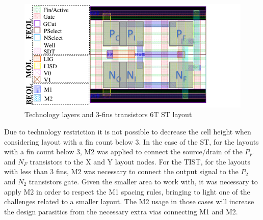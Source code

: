 \documentclass[pgmicro,mestrado,english]{iiufrgs}
\begin{document}
\begin{figure}[]
\centering
\includegraphics[width=\textwidth, trim={0 0 1.5cm 0},clip]{camadasSTv2.pdf}
\caption{Technology layers and 3-fins transistors 6T ST layout}
\label{fig:layers}
\end{figure}



Due to technology restriction it is not possible to decrease the cell height when considering layout with a fin count below 3. In the case of the ST, for the layouts with a fin count below 3, M2 was applied to connect the source/drain of the ${P_F}$ and ${N_F}$ transistors to the X and Y layout nodes. For the TIST, for the layouts with less than 3 fins, M2 was necessary to connect the output signal to the $P_2$ and $N_2$ transistors gate. Given the smaller area to work with, it was necessary to apply M2 in order to respect the M1 spacing rules, bringing to light one of the challenges related to a smaller layout. The M2 usage in those cases will increase the design parasitics from the necessary extra vias connecting M1 and M2.
\end{document}
